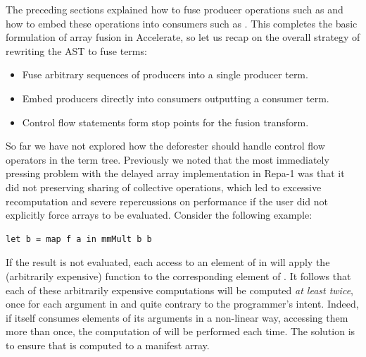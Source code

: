 The preceding sections explained how to fuse producer operations such as
 and how to embed these operations into consumers such as
. This completes the basic formulation of array fusion in
Accelerate, so let us recap on the overall strategy of rewriting the AST to fuse
terms:
%
\begin{itemize}
    \item Fuse arbitrary sequences of producers into a single producer term.
    \item Embed producers directly into consumers outputting a consumer term.
    \item Control flow statements form stop points for the fusion transform.
\end{itemize}
%
So far we have not explored how the deforester should handle control flow
operators in the term tree. Previously we noted that the most immediately
pressing problem with the delayed array implementation in Repa-1 was that it did
not preserving sharing of collective operations, which led to excessive
recomputation and severe repercussions on performance if the user did not
explicitly force arrays to be evaluated. Consider the following example:
%
\begin{lstlisting}[style=haskell,numbers=none]
let b = map f a in mmMult b b
\end{lstlisting}
%
If the result  is not evaluated, each access to an element of
 in  will apply the (arbitrarily expensive) function
 to the corresponding element of . It follows that each of
these arbitrarily expensive computations will be computed \emph{at least twice},
once for each argument in  and quite contrary to the programmer's
intent. Indeed, if  itself consumes elements of its arguments in
a non-linear way, accessing them more than once, the computation of 
will be performed each time. The solution is to ensure that  is
computed to a manifest array.


